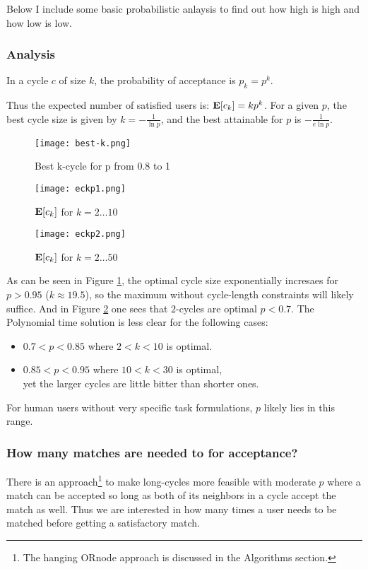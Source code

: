 \documentclass[main.tex]{subfiles}
\begin{document}
Below I include some basic probabilistic anlaysis to find out how high is high and how low is low.

\subsubsection{Analysis}

In a cycle $c$ of size $k$, the probability of acceptance is $p_k = p^k$.

Thus the expected number of satisfied users is: $\mathbf{E}[c_k] = k p^k$. For a given $p$, the best cycle size is given by $k = -\frac{1}{\ln p}$, and the best attainable for $p$ is $-\frac{1}{e \ln p}$.

\begin{figure}
  \texttt{[image: best-k.png]}
  \caption{Best k-cycle for p from 0.8 to 1}
  \label{best-k}
\end{figure}

\begin{figure}
  \texttt{[image: eckp1.png]}
  \caption{$\mathbf{E}[c_k]$ for $k = 2 \dots 10$}
  \label{eckp1}
\end{figure}

\begin{figure}
  \texttt{[image: eckp2.png]}
  \caption{$\mathbf{E}[c_k]$ for $k = 2 \dots 50$}
  \label{eckp2}
\end{figure}

As can be seen in Figure \ref{best-k}, the optimal cycle size exponentially incresaes for $p > 0.95$ ($k \approx 19.5$), so the maximum without cycle-length constraints will likely suffice. And in Figure \ref{eckp1} one sees that $2$-cycles are optimal $p < 0.7$. The Polynomial time solution is less clear for the following cases:
\begin{itemize}
  \item $0.7 < p < 0.85$ where $ 2 < k < 10$ is optimal.
  \item $0.85 < p < 0.95$ where $ 10 < k < 30$ is optimal,
      \\yet the larger cycles are little bitter than shorter ones.
\end{itemize}

For human users without very specific task formulations, $p$ likely lies in this range.

\subsubsection{How many matches are needed to for acceptance?}
There is an approach\footnote{The hanging ORnode approach is discussed in the Algorithms section.} to make long-cycles more feasible with moderate $p$ where a match can be accepted so long as both of its neighbors in a cycle accept the match as well. Thus we are interested in how many times a user needs to be matched before getting a satisfactory match.
\end{document}
